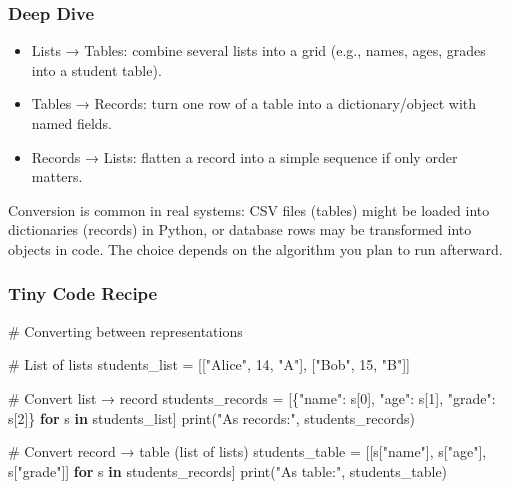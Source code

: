 \documentclass[
  letterpaper,
  DIV=11,
  numbers=noendperiod]{scrreprt}
\newenvironment{Shaded}{\begin{snugshade}}{\end{snugshade}}
\newcommand{\BuiltInTok}[1]{\textcolor[rgb]{0.00,0.23,0.31}{#1}}
\newcommand{\CommentTok}[1]{\textcolor[rgb]{0.37,0.37,0.37}{#1}}
\newcommand{\ControlFlowTok}[1]{\textcolor[rgb]{0.00,0.23,0.31}{\textbf{#1}}}
\newcommand{\DecValTok}[1]{\textcolor[rgb]{0.68,0.00,0.00}{#1}}
\newcommand{\KeywordTok}[1]{\textcolor[rgb]{0.00,0.23,0.31}{\textbf{#1}}}
\newcommand{\NormalTok}[1]{\textcolor[rgb]{0.00,0.23,0.31}{#1}}
\newcommand{\OperatorTok}[1]{\textcolor[rgb]{0.37,0.37,0.37}{#1}}
\newcommand{\StringTok}[1]{\textcolor[rgb]{0.13,0.47,0.30}{#1}}
\providecommand{\tightlist}{%
  \setlength{\itemsep}{0pt}\setlength{\parskip}{0pt}}
\begin{document}
\subsubsection{Deep Dive}\label{deep-dive-28}

\begin{itemize}
\tightlist
\item
  Lists → Tables: combine several lists into a grid (e.g., names, ages,
  grades into a student table).
\item
  Tables → Records: turn one row of a table into a dictionary/object
  with named fields.
\item
  Records → Lists: flatten a record into a simple sequence if only order
  matters.
\end{itemize}

Conversion is common in real systems: CSV files (tables) might be loaded
into dictionaries (records) in Python, or database rows may be
transformed into objects in code. The choice depends on the algorithm
you plan to run afterward.

\subsubsection{Tiny Code Recipe}\label{tiny-code-recipe-56}

\begin{Shaded}
\begin{Highlighting}[]
\CommentTok{\# Converting between representations}

\CommentTok{\# List of lists}
\NormalTok{students\_list }\OperatorTok{=}\NormalTok{ [[}\StringTok{"Alice"}\NormalTok{, }\DecValTok{14}\NormalTok{, }\StringTok{"A"}\NormalTok{], [}\StringTok{"Bob"}\NormalTok{, }\DecValTok{15}\NormalTok{, }\StringTok{"B"}\NormalTok{]]}

\CommentTok{\# Convert list → record}
\NormalTok{students\_records }\OperatorTok{=}\NormalTok{ [\{}\StringTok{"name"}\NormalTok{: s[}\DecValTok{0}\NormalTok{], }\StringTok{"age"}\NormalTok{: s[}\DecValTok{1}\NormalTok{], }\StringTok{"grade"}\NormalTok{: s[}\DecValTok{2}\NormalTok{]\} }\ControlFlowTok{for}\NormalTok{ s }\KeywordTok{in}\NormalTok{ students\_list]}
\BuiltInTok{print}\NormalTok{(}\StringTok{"As records:"}\NormalTok{, students\_records)}

\CommentTok{\# Convert record → table (list of lists)}
\NormalTok{students\_table }\OperatorTok{=}\NormalTok{ [[s[}\StringTok{"name"}\NormalTok{], s[}\StringTok{"age"}\NormalTok{], s[}\StringTok{"grade"}\NormalTok{]] }\ControlFlowTok{for}\NormalTok{ s }\KeywordTok{in}\NormalTok{ students\_records]}
\BuiltInTok{print}\NormalTok{(}\StringTok{"As table:"}\NormalTok{, students\_table)}
\end{Highlighting}
\end{Shaded}
\end{document}
